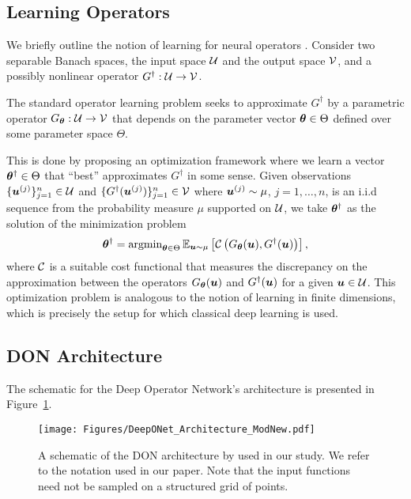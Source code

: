 \subsection{Learning Operators}\label{subsec:LearningInfiniteDimensions}
\label{subsec:Learning_Operators}We briefly outline the notion of learning for neural operators \citep{li_fourier_2021,li_neural_2020,lu20201DeepONet}. 
Consider two separable Banach spaces, the input space ${\mathcal{U}}$ and the output space ${\mathcal{V}}$, and a possibly nonlinear operator $G^\dagger: {\mathcal{U}}\to {\mathcal{V}}$. 

The standard operator learning problem seeks to approximate $G^\dagger$ by a parametric operator $G_{{\bm{\theta}}}: {\mathcal{U}}\to{\mathcal{V}}$ that depends on the parameter vector ${\bm{\theta}}\in \Theta$ defined over some parameter space $\Theta$. 

This is done by proposing an optimization framework where we learn a vector ${\bm{\theta}}^\dagger\in\Theta$ that ``best'' approximates $G^\dagger$ in some sense. 
Given observations $\{{\bm{u}}^{(j)}\}_{j=1}^n\in{\mathcal{U}}$ and $\{G^{\dagger}({\bm{u}}^{(j)})\}_{j=1}^n\in {\mathcal{V}}$ where ${\bm{u}}^{(j)}\sim\mu$, $j=1,\dots,n$, is an i.i.d sequence from the probability measure $\mu$ supported on ${\mathcal{U}}$, we take ${\bm{\theta}}^{\dagger}$ as the solution of the minimization problem
\begin{equation}
    {\bm{\theta}}^{\dagger}
    =
    \operatorname{argmin}_{{\bm{\theta}} \in \Theta} \mathbb{E}_{{\bm{u}} \sim \mu}\left[
        {\mathcal{C}}\left(G_{{\bm{\theta}}}({\bm{u}}), G^{\dagger}({\bm{u}})\right)
    \right],
    \label{eq:learningProblemInfiniteDimensions}
\end{equation}
where ${\mathcal{C}}$ is a suitable cost functional that measures the discrepancy on the approximation between the operators $G_{{\bm{\theta}}}({\bm{u}})$ and $G^{\dagger}({\bm{u}})$ for a given ${\bm{u}}\in{\mathcal{U}}$. This optimization problem is analogous to the notion of learning in finite dimensions, which is precisely the setup for which classical deep learning is used.

\subsection{DON Architecture}
The schematic for the Deep Operator Network's architecture is presented in Figure~\ref{fig:deeponetArchitecture}.

\begin{figure}[H]
    \centering
    \texttt{[image: Figures/DeepONet\_Architecture\_ModNew.pdf]}
    \caption{
    A schematic of the %
    DON architecture by \citet{lu20201DeepONet} used in our study. We refer to the notation used in our paper. Note that the input functions need not be sampled on a structured grid of points.
    }
    \label{fig:deeponetArchitecture}
\end{figure}


